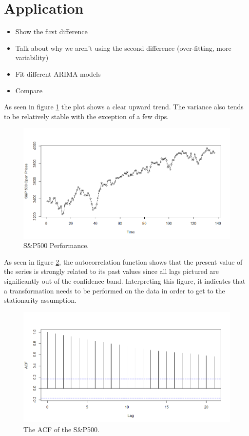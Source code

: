 \documentclass[12pt, centerh1]{article}
\begin{document}
\section{Application}
\begin{itemize}
    \item Show the first difference
    \item Talk about why we aren't using the second difference (over-fitting, more variability)
    \item Fit different ARIMA models
    \item Compare
\end{itemize}
As seen in figure \ref{fig:USA_open} the plot shows a clear upward trend. The variance also tends to be relatively stable with the exception of a few dips.
\begin{figure}[H]
    \centering
    \includegraphics[width=\linewidth]{imgs/USA_open.png}
    \caption{S\&P500 Performance.}
    \label{fig:USA_open}
\end{figure}
As seen in figure \ref{fig:acf}, the autocorrelation function shows that the present value of the series is strongly related to its past values since all lags pictured are significantly out of the confidence band. Interpreting this figure, it indicates that a transformation needs to be performed on the data in order to get to the stationarity assumption.  
\begin{figure}[H]
    \centering
    \includegraphics[width=\linewidth]{imgs/acf.png}
    \caption{The ACF of the S\&P500.}
    \label{fig:acf}
\end{figure}
\end{document}
